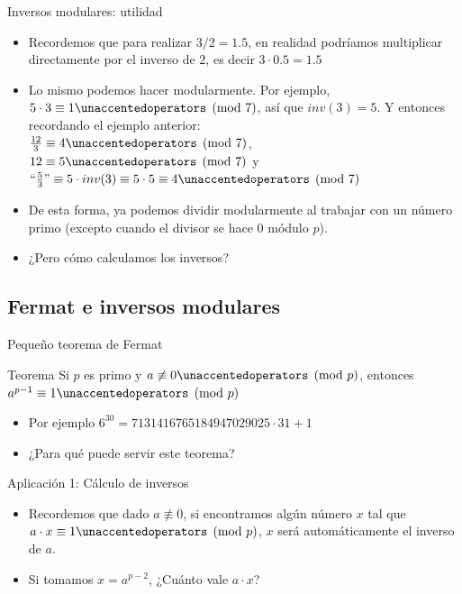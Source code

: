 \documentclass{beamer}
\begin{document}
\begin{frame}{Inversos modulares: utilidad}
    \begin{itemize}
        \item Recordemos que para realizar $3 / 2 = 1.5$, en realidad podríamos multiplicar directamente por el inverso de $2$, es decir $3 \cdot 0.5 = 1.5$
        \item Lo mismo podemos hacer modularmente. Por ejemplo, $5 \cdot 3 \equiv 1 \modulo{7}$, así que $inv(3)=5$. Y entonces recordando el ejemplo anterior:\\
               $\frac{12}{3}\equiv 4 \modulo{7}$, \\ $12 \equiv 5 \modulo{7}$ y \\$\mbox{``}\frac{5}{3}\mbox{''} \equiv 5 \cdot inv(3) \equiv 5 \cdot 5 \equiv 4 \modulo{7}$ 
        \item De esta forma, ya podemos dividir modularmente al trabajar con un número primo (excepto cuando el divisor se hace $0$ módulo $p$).
        \item ¿Pero cómo calculamos los inversos?
    \end{itemize}

\end{frame}

\subsection{Fermat e inversos modulares}

\begin{frame}{Pequeño teorema de Fermat}
  \begin{block}{Teorema}
  Si $p$ es primo y $a \not \equiv 0 \modulo{p}$, entonces $a^{p-1} \equiv 1 \modulo{p}$
  \end{block}
  \begin{itemize}
      \item Por ejemplo $6^{30} = 7131416765184947029025 \cdot 31 + 1$
      \item ¿Para qué puede servir este teorema?
  \end{itemize}
\end{frame}

\begin{frame}{Aplicación 1: Cálculo de inversos}
  \begin{itemize}
      \item Recordemos que dado $a \not \equiv 0$, si encontramos algún número $x$ tal que $a \cdot x \equiv 1 \modulo{p}$, $x$ será automáticamente el inverso de $a$.
      \item Si tomamos $x = a^{p-2}$, ¿Cuánto vale $a \cdot x$?
      \pause
      \pause
  \end{itemize}
\end{frame}
\end{document}
